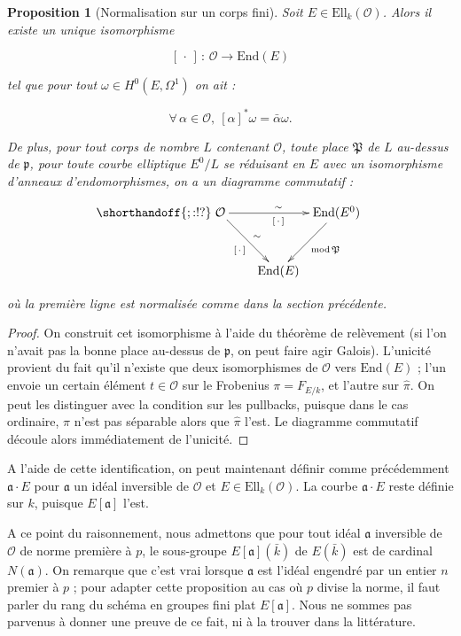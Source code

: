 \documentclass[11pt,a4paper]{article}
\renewcommand{\O}{\mathcal{O}}
\newcommand{\vers}{\longrightarrow}
\newcommand{\End}{\mathrm{End}}
\newcommand{\Ell}{\mathrm{Ell}}
\renewcommand{\frak}{\mathfrak}
\newcommand{\de}{\,:\,}
\newtheorem*{prop}{Proposition}
\theoremstyle{definition}
\begin{document}
\begin{prop}[Normalisation sur un corps fini]

Soit $E\in \Ell_k(\O)$. Alors il existe un unique isomorphisme

$$[\,\cdot\,] \de \O \vers \End(E)$$

tel que pour tout $\omega \in H^0(E,\Omega^1)$ on ait :

$$\forall \, \alpha \in \O,\ [\alpha]^* \omega = \bar{\alpha}\omega.$$

De plus, pour tout corps de nombre $L$ contenant $\O$, toute place $\frak P$ de $L$ au-dessus de $\frak p$, pour toute courbe elliptique $E^0/L$ se réduisant en $E$ avec un isomorphisme d'anneaux d'endomorphismes, on a un diagramme commutatif :

$$
\shorthandoff{;:!?}
\xymatrix @!=8mm {
\O \ar[rr]^\sim_{[\,\cdot\,]} \ar[rd]^\sim_{[\,\cdot\,]} & & \End(E^0) \ar[ld]^{\mathrm{mod}\,\frak P} \\
 & \End(E) & 
}
$$

où la première ligne est normalisée comme dans la section précédente.

\end{prop}

\begin{proof}

On construit cet isomorphisme à l'aide du théorème de relèvement (si l'on n'avait pas la bonne place au-dessus de $\frak p$, on peut faire agir Galois). L'unicité provient du fait qu'il n'existe que deux isomorphismes de $\O$ vers $\End(E)$ ; l'un envoie un certain élément $t\in \O$ sur le Frobenius $\pi = F_{E/k}$, et l'autre sur $\widehat{\pi}.$ On peut les distinguer avec la condition sur les pullbacks, puisque dans le cas ordinaire, $\pi$ n'est pas séparable alors que $\widehat{\pi}$ l'est. Le diagramme commutatif découle alors immédiatement de l'unicité.
\end{proof}

A l'aide de cette identification, on peut maintenant définir comme précédemment $\frak a\cdot E$ pour $\frak a$ un idéal inversible de $\O$ et $E\in \Ell_k(\O)$. La courbe $\frak a\cdot E$ reste définie sur $k$, puisque $E[\frak a]$ l'est.

A ce point du raisonnement, nous admettons que pour tout idéal $\frak a$ inversible de $\O$ de norme première à $p$, le sous-groupe $E[\frak a](\bar{k})$ de $ E(\bar{k})$ est de cardinal $N(\frak a)$. On remarque que c'est vrai lorsque $\frak a$ est l'idéal engendré par un entier $n$ premier à $p$ ; pour adapter cette proposition au cas où $p$ divise la norme, il faut parler du rang du schéma en groupes fini plat $E[\frak a]$. Nous ne sommes pas parvenus à donner une preuve de ce fait, ni à la trouver dans la littérature.
\end{document}
